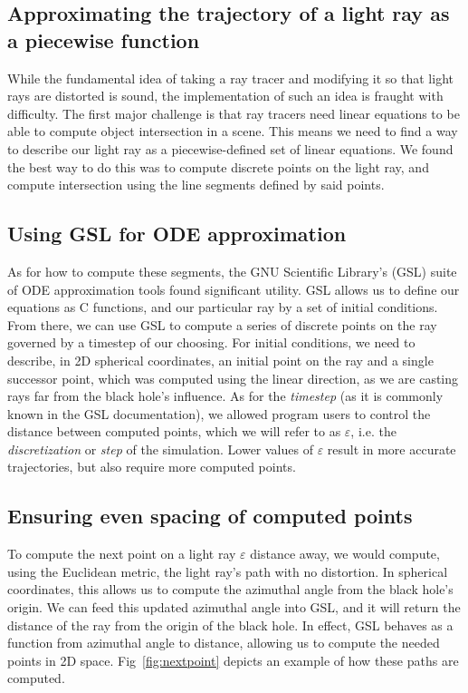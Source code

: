 \subsection{Approximating the trajectory of a light ray as a piecewise function}
While the fundamental idea of taking a ray tracer and modifying it so that light rays are distorted is sound, the implementation of such an idea is fraught with difficulty. The first major challenge is that ray tracers need linear equations to be able to compute object intersection in a scene. This means we need to find a way to describe our light ray as a piecewise-defined set of linear equations. We found the best way to do this was to compute discrete points on the light ray, and compute intersection using the line segments defined by said points. 


\subsection{Using GSL for ODE approximation}
As for how to compute these segments, the GNU Scientific Library's (GSL) suite \cite{10.5555/1538674} of ODE approximation tools found significant utility. GSL allows us to define our equations as C functions, and our particular ray by a set of initial conditions. From there, we can use GSL to compute a series of discrete points on the ray governed by a timestep of our choosing. For initial conditions, we need to describe, in 2D spherical coordinates, an initial point on the ray and a single successor point, which was computed using the linear direction, as we are casting rays far from the black hole's influence. As for the \textit{timestep} (as it is commonly known in the GSL documentation), we allowed program users to control the distance between computed points, which we will refer to as $\varepsilon$, i.e. the \textit{discretization} or \textit{step} of the simulation. Lower values of $\varepsilon$ result in more accurate trajectories, but also require more computed points. 

\subsection{Ensuring even spacing of computed points}
To compute the next point on a light ray $\varepsilon$ distance away, we would compute, using the Euclidean metric, the light ray's path with no distortion. In spherical coordinates, this allows us to compute the azimuthal angle from the black hole's origin. We can feed this updated azimuthal angle into GSL, and it will return the distance of the ray from the origin of the black hole. In effect, GSL behaves as a function from azimuthal angle to distance, allowing us to compute the needed points in 2D space.
Fig~\ref{fig:nextpoint} depicts an example of how these paths are computed.


